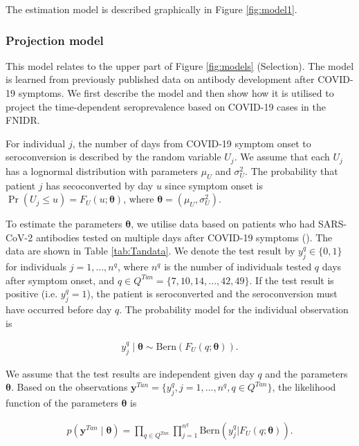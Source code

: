 \documentclass[aoas]{imsart}
\begin{document}
The estimation model is described graphically in Figure \ref{fig:model1}.

\subsubsection{Projection model} \label{seq:model2}

This model relates to the upper part of Figure \ref{fig:models} (Selection). The model is learned from previously published data on antibody development after COVID-19 symptoms. We first describe the model and then show how it is utilised to project the time-dependent seroprevalence based on COVID-19 cases in the FNIDR. 

For individual $j$, the number of days from COVID-19 symptom onset to seroconversion is described by the random variable $U_j$. We assume that each $U_j$ has a lognormal distribution with parameters $\mu_U$ and $\sigma_U^2$. The probability that patient $j$ has secoconverted by day $u$ since symptom onset is $\Pr(U_j \leq u) = F_U(u ; \mathbf{\theta})$, where $\mathbf{\theta} = (\mu_U, \sigma_U^2)$.

To estimate the parameters $\mathbf{\theta}$, we utilise data based on patients who had SARS-CoV-2 antibodies tested on multiple days after COVID-19 symptoms (\cite{Tan2020}). The data are shown in Table \ref{tab:Tandata}. We denote the test result by $y_j^{q} \in \{0, 1\}$ for individuals $j = 1, ...,  n^{q}$, where $n^{q}$ is the number of individuals tested $q$ days after symptom onset, and $q \in Q^{Tan} = \{7, 10, 14, ..., 42, 49 \}$. If the test result is positive (i.e. $y_j^{q} = 1$), the patient is seroconverted and the seroconversion must have occurred before day $q$. The probability model for the individual observation is 

\begin{equation}\label{eq:model2_prob}
\begin{split}
y_j^{q}\mid \mathbf{\theta} \sim \text{Bern}( F_U(q ; \mathbf{\theta})).
\end{split}
\end{equation}

We assume that the test results are independent given day $q$ and the parameters $\mathbf{\theta}$. Based on the observations $\mathbf{y}^{Tan} =  \{y_j^q, j = 1, ..., n^q, q \in Q^{Tan}\}$, the likelihood function of the parameters $\mathbf{\theta}$ is

\begin{equation}\label{eq:model2_lik}
\begin{split}
p(\mathbf{y}^{Tan}\mid \mathbf{\theta}) = \prod_{q \in Q^{Tan}} \prod_{j = 1}^{n^q} \text{Bern}(y_j^{q} \vert F_U(q ; \mathbf{\theta})).
\end{split}
\end{equation}
\end{document}

